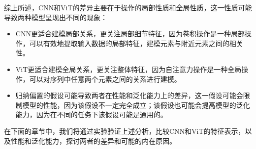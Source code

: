 综上所述，CNN和ViT的差异主要在于操作的局部性质和全局性质，这一性质可能导致两种模型呈现出不同的现象：

\begin{itemize}
    \item CNN更适合建模局部关系，更关注局部细节特征，因为卷积操作是一种局部操作，可以有效地提取输入数据的局部特征，建模元素与附近元素之间的相关性。
    \item ViT更适合建模全局关系，更关注整体特征，因为自注意力操作是一种全局操作，可以对序列中任意两个元素之间的关系进行建模。
    \item 归纳偏置的假设可能导致两者在性能和泛化能力上的差异，这一假设可能会限制模型的性能，因为该假设不一定完全成立；该假设也可能会提高模型的泛化能力，因为在不同的任务下该假设可能是通用的。
\end{itemize}

在下面的章节中，我们将通过实验验证上述分析，比较CNN和ViT的特征表示，以及性能和泛化能力，探讨两者的差异和可能的内在原因。
